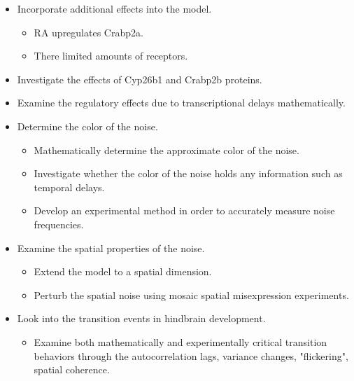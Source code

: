 \begin{itemize}
\item Incorporate additional effects into the model.
\begin{itemize}
\item RA upregulates Crabp2a.
\item There limited amounts of receptors.
\end{itemize}
\item Investigate the effects of Cyp26b1 and Crabp2b proteins.
\item Examine the regulatory effects due to transcriptional delays mathematically.
\item Determine the color of the noise.
\begin{itemize}
\item Mathematically determine the approximate color of the noise.
\item Investigate whether the color of the noise holds any information such as temporal delays.
\item Develop an experimental method in order to accurately measure noise frequencies.
\end{itemize}
\item Examine the spatial properties of the noise.
\begin{itemize}
\item Extend the model to a spatial dimension.
\item Perturb the spatial noise using mosaic spatial misexpression experiments.
\end{itemize}
\item Look into the transition events in hindbrain development.
\begin{itemize}
\item Examine both mathematically and experimentally critical transition behaviors through the autocorrelation lags, variance changes, "flickering", spatial coherence.
\end{itemize}
\end{itemize}